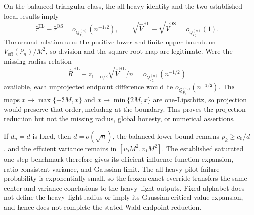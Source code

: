 On the balanced triangular class, the all-heavy identity and the two
established local results imply
\[
 \widehat\tau^{\mathrm{HL}}-\widehat\tau^{\mathrm{OS}}
 =o_{Q_{P_n}^{(n)}}(n^{-1/2}),
 \qquad
 \sqrt{\widehat V^{\mathrm{HL}}}
 -\sqrt{\widehat V^{\mathrm{OS}}}=o_{Q_{P_n}^{(n)}}(1).
\]
The second relation uses the positive lower and finite upper bounds on
\(V_{\mathrm{eff}}(P_n)/M^2\), so division and the square-root map are
legitimate.  Were the missing radius relation
\[
 \widehat R^{\mathrm{HL}}
 -z_{1-\alpha/2}\sqrt{\widehat V^{\mathrm{HL}}/n}
 =o_{Q_{P_n}^{(n)}}(n^{-1/2})
\]
available, each unprojected endpoint difference would be
\(o_{Q_{P_n}^{(n)}}(n^{-1/2})\).  The maps
\(x\mapsto\max\{-2M,x\}\) and \(x\mapsto\min\{2M,x\}\) are
one-Lipschitz, so projection would preserve that order, including at the
boundary.  This proves the projection reduction but not the missing radius,
global honesty, or numerical assertions.

If \(d_n=d\) is fixed, then \(d=o(\sqrt n)\), the balanced lower bound remains
\(p_k\ge c_0/d\), and the efficient variance remains in
\([v_0M^2,v_1M^2]\).  The established saturated one-step benchmark therefore
gives its efficient-influence-function expansion, ratio-consistent variance,
and Gaussian limit.  The all-heavy pilot failure probability is exponentially
small, so the frozen exact override transfers the same center and variance
conclusions to the heavy--light outputs.  Fixed alphabet does not define the
heavy--light radius or imply its Gaussian critical-value expansion, and hence
does not complete the stated Wald-endpoint reduction.
